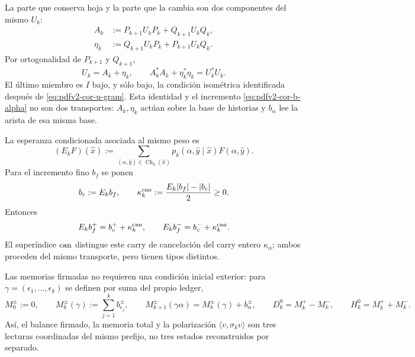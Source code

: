 La parte que conserva hoja y la parte que la cambia son dos componentes del
mismo \(U_k\):
\begin{align}
 A_k&:=P_{k+1}U_kP_k+Q_{k+1}U_kQ_k,
 \label{eq:pdfv2-cor-a-comun}\\
 \eta_k&:=Q_{k+1}U_kP_k+P_{k+1}U_kQ_k.
 \label{eq:pdfv2-cor-eta-comun}
\end{align}
Por ortogonalidad de \(P_{k+1}\) y \(Q_{k+1}\),
\begin{equation}
\label{eq:pdfv2-cor-balance-hojas}
 U_k=A_k+\eta_k,\qquad
 A_k^*A_k+\eta_k^*\eta_k=U_k^*U_k.
\end{equation}
El último miembro es \(I\) bajo, y sólo bajo, la condición isométrica
identificada después de \eqref{eq:pdfv2-cor-u-gram}.
Esta identidad y el incremento \eqref{eq:pdfv2-cor-b-alpha} no son dos
transportes: \(A_k,\eta_k\) actúan sobre la base de historias y
\(b_\alpha\) lee la arista de esa misma base.

La esperanza condicionada asociada al mismo peso es
\begin{equation}
\label{eq:pdfv2-cor-esperanza-comun}
 (E_kF)(\widehat x):=
 \sum_{(\alpha,\widehat y)\in\operatorname{Ch}_k(\widehat x)}
 p_k(\alpha,\widehat y\mid\widehat x)F(\alpha,\widehat y).
\end{equation}
Para el incremento fino \(b_f\) se ponen
\begin{equation}
\label{eq:pdfv2-cor-kappa-jensen}
 b_c:=E_kb_f,\qquad
 \kappa_k^{\rm can}:=\frac{E_k|b_f|-|b_c|}{2}\geq0.
\end{equation}
Entonces
\begin{equation}
\label{eq:pdfv2-cor-jensen-hojas}
 E_kb_f^+=b_c^++\kappa_k^{\rm can},\qquad
 E_kb_f^-=b_c^-+\kappa_k^{\rm can}.
\end{equation}
El superíndice \({\rm can}\) distingue este carry de cancelación del carry
entero \(\kappa_\alpha\); ambos proceden del mismo transporte, pero tienen
tipos distintos.

Las memorias firmadas no requieren una condición inicial exterior: para
\(\gamma=(\epsilon_1,\ldots,\epsilon_k)\) se definen por suma del propio
ledger,
\begin{equation}
\label{eq:pdfv2-cor-memorias}
 M_0^\pm:=0,\qquad
 M_k^\pm(\gamma):=\sum_{j=1}^k b_{\epsilon_j}^\pm,\qquad
 M_{k+1}^\pm(\gamma\alpha)=M_k^\pm(\gamma)+b_\alpha^\pm,\qquad
 D_k^0=M_k^+-M_k^-,\qquad
 H_k^0=M_k^++M_k^-.
\end{equation}
Así, el balance firmado, la memoria total y la polarización
\(\langle v,\sigma_kv\rangle\) son tres lecturas coordinadas del mismo
prefijo, no tres estados reconstruidos por separado.


